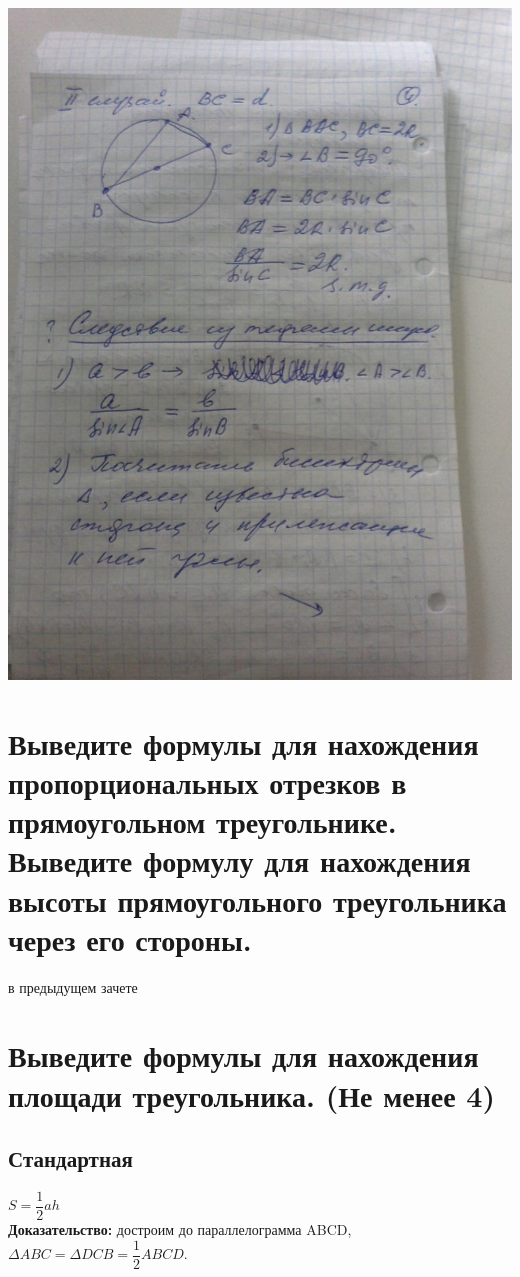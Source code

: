 \documentclass[12pt, letterpaper]{article}
\begin{document}
\includegraphics[scale=0.3]{photo7.jpg} \\

\section {Выведите формулы для нахождения пропорциональных отрезков в прямоугольном треугольнике. Выведите формулу для нахождения высоты прямоугольного треугольника через его стороны.}
в предыдущем зачете

\section {Выведите формулы для нахождения площади треугольника. (Не менее 4)}
\subsection {Стандартная}
$S=\dfrac{1}{2}ah $ \\
\textbf{Доказательство:} достроим до параллелограмма ABCD,\\
$\Delta ABC = \Delta DCB = \dfrac{1}{2}ABCD. $ \\
\end{document}
